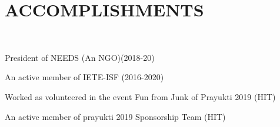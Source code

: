 \documentclass[]{deedy-resume-openfont}
\begin{document}
\begin{minipage}[t]{0.43\textwidth}
\vspace{5pt}





\vspace{5pt}
\section{ACCOMPLISHMENTS} 
\ \
\vspace{\topsep}
\begin{tightemize}
\item President of NEEDS (An NGO)(2018-20)
\item An active member of IETE-ISF (2016-2020)
\item Worked as volunteered in the event Fun from Junk of Prayukti 2019 (HIT)
\item An active member of prayukti 2019 Sponsorship Team (HIT)
\end{tightemize}
\sectionsep


\end{minipage}
\end{document}
